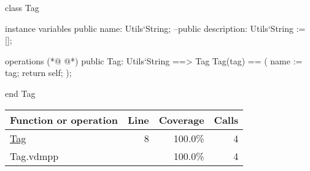 \begin{vdmpp}[breaklines=true]
class Tag

 instance variables
  public name: Utils`String;
  --public description: Utils`String := [];
 
 operations
(*@
\label{Tag:8}
@*)
  public Tag: Utils`String ==> Tag
  Tag(tag) == (
   name := tag;
   return self;
  );

end Tag
\end{vdmpp}
\bigskip
\begin{longtable}{|l|r|r|r|}
\hline
Function or operation & Line & Coverage & Calls \\
\hline
\hline
\hyperref[Tag:8]{Tag} & 8&100.0\% & 4 \\
\hline
\hline
Tag.vdmpp & & 100.0\% & 4 \\
\hline
\end{longtable}

